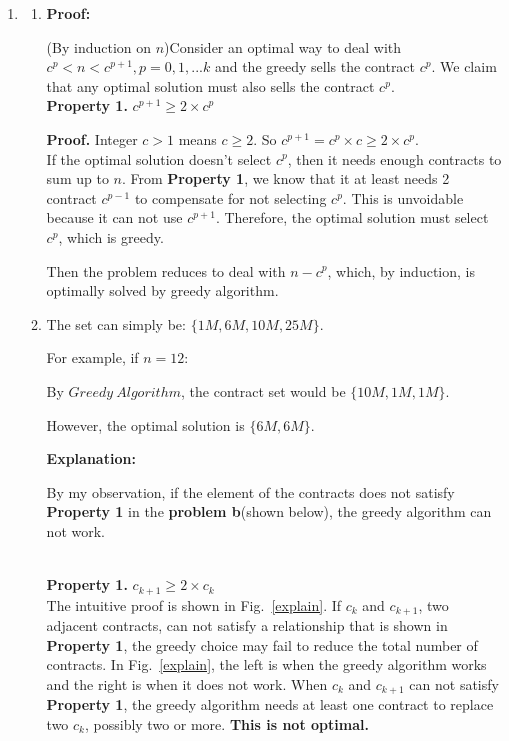 \documentclass[12pt,a4paper]{article}
\makeatletter
\newtheorem*{solution}{Solution}
\theoremstyle{definition}
\renewenvironment{solution}[1][Solution] {\par\pushQED{\qed}\normalfont\topsep6\p@\@plus6\p@\relax\trivlist\item[\hskip\labelsep\bfseries#1\@addpunct{.}]\ignorespaces}{\popQED\endtrivlist\@endpefalse} \makeatother
\makeatother
\begin{document}
\begin{enumerate}
\begin{solution}
\begin{enumerate}
\item

\textbf{Proof:}


(By induction on $n$)Consider an optimal way to deal with $c^p<n<c^{p+1}, p=0,1,...k$ and the greedy sells the contract $c^p$. We claim that any optimal solution must also  sells the contract $c^p$.
~\\

\textbf{Property 1.} $ c^{p+1} \geq 2\times c^{p}$

\textbf{Proof.} Integer $c>1$ means $c\geq2$. So $c^{p+1}=c^p\times c\geq 2\times c^p$.
~\\

If the optimal solution doesn't select $c^p$, then it needs enough contracts to sum up to $n$. From \textbf{Property 1}, we know that it at least needs 2 contract $c^{p-1}$ to compensate for not selecting $c^p$. This is unvoidable because it can not use $c^{p+1}$. Therefore, the optimal solution must select $c^p$, which is greedy.

Then the problem reduces to deal with $n-c^p$, which, by induction, is optimally solved by greedy algorithm.

\item
The set can simply be: $\{1M, 6M, 10M, 25M\}$.

For example, if $n=12$:

By $Greedy\ Algorithm$, the contract set would be $\{10M, 1M, 1M\}$.

However, the optimal solution is $\{6M, 6M\}$.

\textbf{Explanation:}

By my observation, if the element of the contracts does not satisfy \textbf{Property 1} in the \textbf{problem b}(shown below), the greedy algorithm can not work. 

~\\
\textbf{Property 1.} $c_{k+1}\geq 2\times c_{k}$
~\\

The intuitive proof is shown in Fig.~\ref{explain}. If $c_k$ and $c_{k+1}$, two adjacent contracts, can not satisfy a relationship that is shown in \textbf{Property 1}, the greedy choice may fail to reduce the total number of contracts. In Fig.~\ref{explain}, the left is when the greedy algorithm works and the right is when it does not work. When $c_k$ and $c_{k+1}$ can not satisfy \textbf{Property 1}, the greedy algorithm needs at least one contract to replace two $c_k$, possibly two or more. \textbf{This is not optimal.}




\end{enumerate}
\end{solution}
\end{enumerate}
\end{document}
